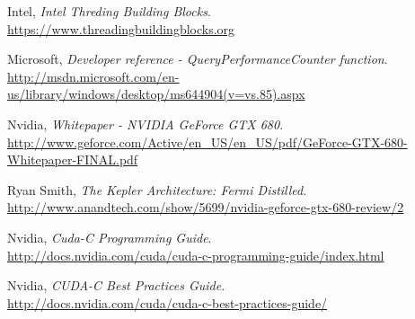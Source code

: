 \documentclass[11pt, oneside, a4paper]{article}
\begin{document}
\begin{thebibliography}{9}

  Intel,
  \emph{Intel Threding Building Blocks}. \\
  \url{https://www.threadingbuildingblocks.org}

  Microsoft,
  \emph{Developer reference - QueryPerformanceCounter function}. \\
  \url{http://msdn.microsoft.com/en-us/library/windows/desktop/ms644904(v=vs.85).aspx}

	Nvidia,
	\emph{Whitepaper - NVIDIA GeForce GTX 680}. \\
	\url{http://www.geforce.com/Active/en_US/en_US/pdf/GeForce-GTX-680-Whitepaper-FINAL.pdf}

	Ryan Smith,
	\emph{The Kepler Architecture: Fermi Distilled}. \\
	\url{http://www.anandtech.com/show/5699/nvidia-geforce-gtx-680-review/2}

	Nvidia,
	\emph{Cuda-C Programming Guide}. \\
	\url{http://docs.nvidia.com/cuda/cuda-c-programming-guide/index.html}

	Nvidia,
	\emph{CUDA-C Best Practices Guide}. \\
	\url{http://docs.nvidia.com/cuda/cuda-c-best-practices-guide/}

\end{thebibliography}
\end{document}

